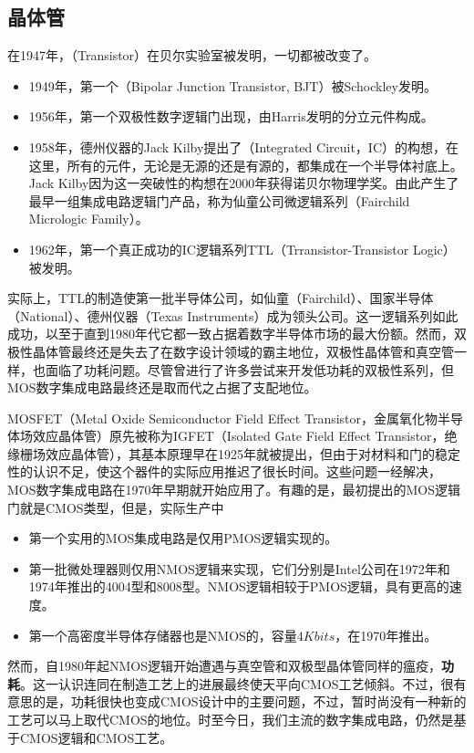 \subsection{晶体管}
在1947年，（Transistor）在贝尔实验室被发明，一切都被改变了。

\begin{itemize}
    \item 1949年，第一个（Bipolar Junction Transistor, BJT）被Schockley发明。
    \item 1956年，第一个双极性数字逻辑门出现，由Harris发明的分立元件构成。
    \item 1958年，德州仪器的Jack Kilby提出了（Integrated Circuit，IC）的构想，在这里，所有的元件，无论是无源的还是有源的，都集成在一个半导体衬底上。Jack Kilby因为这一突破性的构想在2000年获得诺贝尔物理学奖。由此产生了最早一组集成电路逻辑门产品，称为仙童公司微逻辑系列（Fairchild Micrologic Family）。
    \item 1962年，第一个真正成功的IC逻辑系列TTL（Trransistor-Transistor Logic）被发明。
\end{itemize}
实际上，TTL的制造使第一批半导体公司，如仙童（Fairchild）、国家半导体（National）、德州仪器（Texas Instruments）成为领头公司。这一逻辑系列如此成功，以至于直到1980年代它都一致占据着数字半导体市场的最大份额。然而，双极性晶体管最终还是失去了在数字设计领域的霸主地位，双极性晶体管和真空管一样，也面临了功耗问题。尽管曾进行了许多尝试来开发低功耗的双极性系列，但MOS数字集成电路最终还是取而代之占据了支配地位。

MOSFET（Metal Oxide Semiconductor Field Effect Transistor，金属氧化物半导体场效应晶体管）原先被称为IGFET（Isolated Gate Field Effect Transistor，绝缘栅场效应晶体管），其基本原理早在1925年就被提出，但由于对材料和门的稳定性的认识不足，使这个器件的实际应用推迟了很长时间。这些问题一经解决，MOS数字集成电路在1970年早期就开始应用了。有趣的是，最初提出的MOS逻辑门就是CMOS类型，但是，实际生产中
\begin{itemize}
    \item 第一个实用的MOS集成电路是仅用PMOS逻辑实现的。
    \item 第一批微处理器则仅用NMOS逻辑来实现，它们分别是Intel公司在1972年和1974年推出的4004型和8008型。NMOS逻辑相较于PMOS逻辑，具有更高的速度。
    \item 第一个高密度半导体存储器也是NMOS的，容量$4\si{Kbits}$，在1970年推出。
\end{itemize}
然而，自1980年起NMOS逻辑开始遭遇与真空管和双极型晶体管同样的瘟疫，\textbf{功耗}。这一认识连同在制造工艺上的进展最终使天平向CMOS工艺倾斜。不过，很有意思的是，功耗很快也变成CMOS设计中的主要问题，不过，暂时尚没有一种新的工艺可以马上取代CMOS的地位。时至今日，我们主流的数字集成电路，仍然是基于CMOS逻辑和CMOS工艺。

